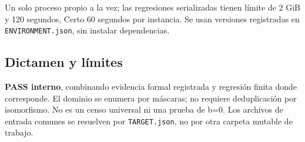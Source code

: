 \documentclass[11pt]{article}
\begin{document}
Un solo proceso propio a la vez; las regresiones serializadas tienen
límite de 2 GiB y 120 segundos, Certo 60 segundos por instancia. Se usan
versiones registradas en \nolinkurl{ENVIRONMENT.json}, sin instalar
dependencias.

\subsection{Dictamen y límites}\label{dictamen-y-luxedmites}

\textbf{PASS interno}, combinando evidencia formal registrada y
regresión finita donde corresponde. El dominio se enumera por máscaras;
no requiere deduplicación por isomorfismo. No es un censo universal ni
una prueba de b=0. Los archivos de entrada comunes se resuelven por
\nolinkurl{TARGET.json}, no por otra carpeta mutable de trabajo.
\end{document}
